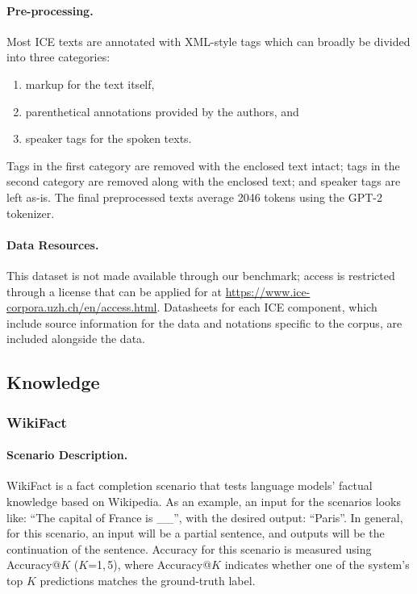 \paragraph{Pre-processing.}
Most ICE texts are annotated with XML-style tags which can broadly be divided into three categories: 
\begin{enumerate}
    \item markup for the text itself,
    \item parenthetical annotations provided by the authors, and
    \item speaker tags for the spoken texts.
\end{enumerate}
Tags in the first category are removed with the enclosed text intact; tags in the second category are removed along with the enclosed text; and speaker tags are left as-is. The final preprocessed texts average 2046 tokens using the GPT-2 tokenizer.

\paragraph{Data Resources.} This dataset is not made available through our benchmark; access is restricted through a license that can be applied for at \url{https://www.ice-corpora.uzh.ch/en/access.html}. Datasheets for each ICE component, which include source information for the data and notations specific to the corpus, are included alongside the data.

\subsection{Knowledge}
\label{app:component-knowledge}

\subsubsection{WikiFact}

\paragraph{Scenario Description.}
WikiFact is a fact completion scenario that tests language models' factual knowledge \citep{petroni2019language, yasunaga2022linkbert} based on Wikipedia.
As an example, an input for the scenarios looks like:
``The capital of France is \_\_'', with the desired output: ``Paris''.
In general, for this scenario, an input will be a partial sentence, and outputs will be the continuation of the sentence.
Accuracy for this scenario is measured using Accuracy@$K$ ($K$=1,\,5), where Accuracy@$K$ indicates whether one of the system's top $K$ predictions matches the ground-truth label. 

